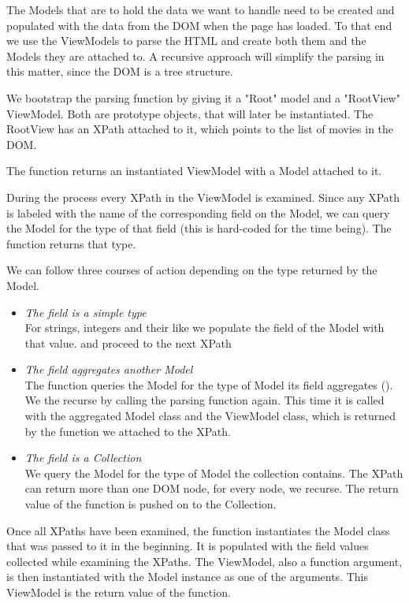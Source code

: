 The Models that are to hold the data we want to handle need to be created and
populated with the data from the DOM when the page has loaded.
To that end we use the ViewModels to parse the HTML and create both them and
the Models they are attached to.
A recursive approach will simplify the parsing in this matter, since the DOM
is a tree structure.

We bootstrap the parsing function by giving it a "Root" model and a "RootView"
ViewModel. Both are prototype objects, that will later be instantiated.
The RootView has an XPath attached to it, which points to the list of movies
in the DOM.

The function returns an instantiated ViewModel with a Model attached to it.

During the process every XPath in the ViewModel is examined.
Since any XPath is labeled with the name of the corresponding field on the
Model, we can query the Model for the type of that field
(this is hard-coded for the time being). The function 
returns that type.

We can follow three courses of action depending on the type
returned by the Model.
\begin{itemize}
	\item \emph{The field is a simple type}\\
	For strings, integers and their like we populate the field of the Model
	with that value. and proceed to the next XPath
	\item \emph{The field aggregates another Model}\\
	The function queries the Model for the type of Model its field aggregates
	().
	We the recurse by calling the parsing function again.
	This time it is called with the aggregated Model class and
	the ViewModel class, which is returned by the  function
	we attached to the XPath.
	\item \emph{The field is a Collection}\\
	We query the Model for the type of Model the collection contains.
	The XPath can return more than one DOM node, for every node, we recurse.
	The return value of the function is pushed on to the Collection.
\end{itemize}

Once all XPaths have been examined, the function instantiates the Model class
that was passed to it in the beginning. It is populated with the field values
collected while examining the XPaths.
The ViewModel, also a function argument, is then instantiated with
the Model instance as one of the arguments.
This ViewModel is the return value of the function.

